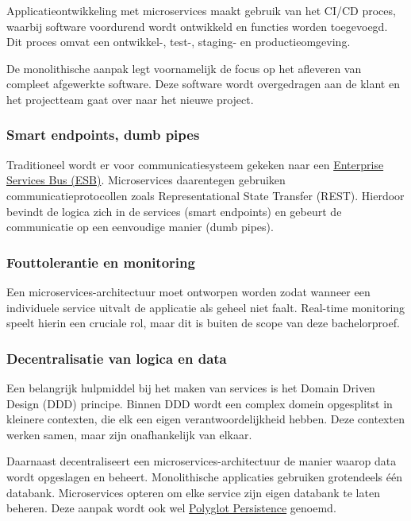 Applicatieontwikkeling met microservices maakt gebruik van het CI/CD proces, waarbij software voordurend wordt ontwikkeld en functies worden toegevoegd. Dit proces omvat een ontwikkel-, test-, staging- en productieomgeving.

De monolithische aanpak legt voornamelijk de focus op het afleveren van compleet afgewerkte software. Deze software wordt overgedragen aan de klant en het projectteam gaat over naar het nieuwe project.

\subsubsection{Smart endpoints, dumb pipes}

Traditioneel wordt er voor communicatiesysteem gekeken naar een \hyperref[sec:ESB]{Enterprise Services Bus (ESB)}. Microservices daarentegen gebruiken communicatieprotocollen zoals Representational State Transfer (REST). Hierdoor bevindt de logica zich in de services (smart endpoints) en gebeurt de communicatie op een eenvoudige manier (dumb pipes).

\subsubsection{Fouttolerantie en monitoring}

Een microservices-architectuur moet ontworpen worden zodat wanneer een individuele service uitvalt de applicatie als geheel niet faalt. Real-time monitoring speelt hierin een cruciale rol, maar dit is buiten de scope van deze bachelorproef.

\subsubsection{Decentralisatie van logica en data}

Een belangrijk hulpmiddel bij het maken van services is het Domain Driven Design (DDD) principe. Binnen DDD wordt een complex domein opgesplitst in kleinere contexten, die elk een eigen verantwoordelijkheid hebben. Deze contexten werken samen, maar zijn onafhankelijk van elkaar.

Daarnaast decentraliseert een microservices-architectuur de manier waarop data wordt opgeslagen en beheert. Monolithische applicaties gebruiken grotendeels één databank. Microservices opteren om elke service zijn eigen databank te laten beheren. Deze aanpak wordt ook wel \hyperref[sec:Polyglot Persistence]{Polyglot Persistence} genoemd.

